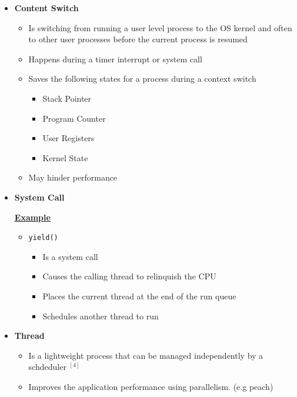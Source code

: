 \documentclass[12pt]{article}
\begin{document}
\begin{enumerate}[1.]
\begin{itemize}
        \item \textbf{Content Switch}

        \begin{itemize}
            \item Is switching from running a user level process to the OS kernel and often
            to other user processes before the current process is resumed
            \item Happens during a timer interrupt or system call
            \item Saves the following states for a process during a context switch
            \begin{itemize}
                \item Stack Pointer
                \item Program Counter
                \item User Registers
                \item Kernel State
            \end{itemize}
            \item May hinder performance
        \end{itemize}

        \item \textbf{System Call}

        \bigskip

        \underline{\textbf{Example}}

        \begin{itemize}
            \item \texttt{yield()}
            \begin{itemize}
                \item Is a system call
                \item Causes the calling thread to relinquish the CPU
                \item Places the current thread at the end of the run queue
                \item Schedules another thread to run
            \end{itemize}
        \end{itemize}

        \item \textbf{Thread}

        \begin{itemize}
            \item Is a lightweight process that can be managed independently by a schdeduler $^{[4]}$
            \item Improves the application performance using parallelism. (e.g peach)


\end{itemize}
\end{itemize}
\end{enumerate}
\end{document}
